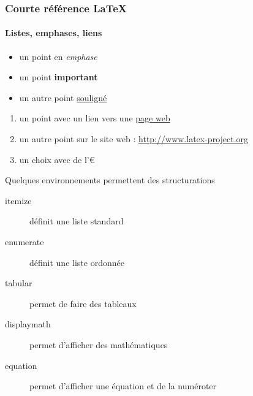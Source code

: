 
\begin{frame}
  \frametitle{Courte référence \LaTeX{}}
  \framesubtitle{Listes, emphases, liens}

  
  \begin{itemize}
  \item un point en \emph{emphase}
  \item un point \textbf{important}
  \item un autre point \underline{souligné}
  \end{itemize} 
  
  \pause  
  
  
  \begin{enumerate}
  \item un point avec un lien vers une \href{http://www.latex-project.org}{page web}
  \item un autre point sur le site web : \url{http://www.latex-project.org}
  \item un choix avec de l'€
  \end{enumerate}

  \pause


  Quelques environnements permettent des structurations 

  \begin{description}
  \item[itemize] définit une liste standard
  \item[enumerate] définit une liste ordonnée
  \item[tabular] permet de faire des tableaux
  \item[displaymath] permet d'afficher des mathématiques
  \item[equation] permet d'afficher une équation et de la numéroter
  \end{description}
\end{frame}


